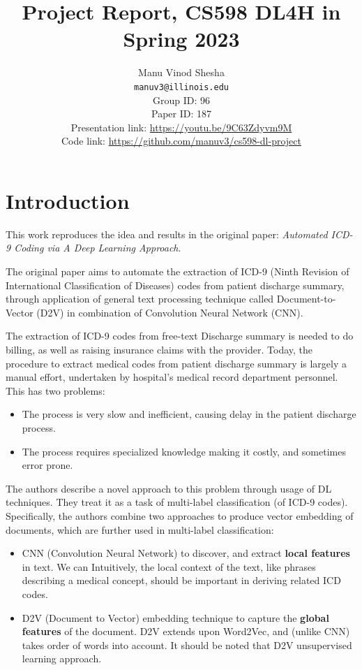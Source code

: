 \documentclass[11pt,a4paper]{article}
\title{Project Report, CS598 DL4H in Spring 2023}
\author{Manu Vinod Shesha \\
  \texttt{manuv3@illinois.edu}
  \\[2em]
  Group ID: 96\\
  Paper ID: 187\\
  Presentation link: \url{https://youtu.be/9C63Zdyvm9M} \\
  Code link: \url{https://github.com/manuv3/cs598-dl-project}}
\begin{document}
\maketitle


\section{Introduction}

This work reproduces the idea and results in the original paper: \textit{Automated ICD-9 Coding via A Deep Learning Approach}\cite{8320340}.

The original paper aims to automate the extraction of ICD-9 (Ninth Revision of International Classification of Diseases) codes from patient discharge summary, through application of general text processing technique called Document-to-Vector (D2V) in combination of Convolution Neural Network (CNN).

The extraction of ICD-9 codes from free-text Discharge summary is needed to do billing, as well as raising insurance claims with the provider. Today, the procedure to extract medical codes from patient discharge summary is largely a manual effort, undertaken by hospital’s medical record department personnel. This has two problems:
\begin{itemize}
    \item The process is very slow and inefficient, causing delay in the patient discharge process.
    \item The process requires specialized knowledge making it costly, and sometimes error prone.
\end{itemize}

The authors describe a novel approach to this problem through usage of DL techniques. They treat it as a task of multi-label classification (of ICD-9 codes). Specifically, the authors combine two approaches to produce vector embedding of documents, which are further used in multi-label classification:
\begin{itemize}
    \item CNN (Convolution Neural Network) to discover, and extract \textbf{local features} in text. We can Intuitively, the local context of the text, like phrases describing a medical concept, should be important in deriving related ICD codes.
    \item D2V (Document to Vector) \cite{le2014distributed} embedding technique to capture the \textbf{global features} of the document. D2V extends upon Word2Vec, and (unlike CNN) takes order of words into account. It should be noted that D2V unsupervised learning approach.
\end{itemize}
\end{document}
